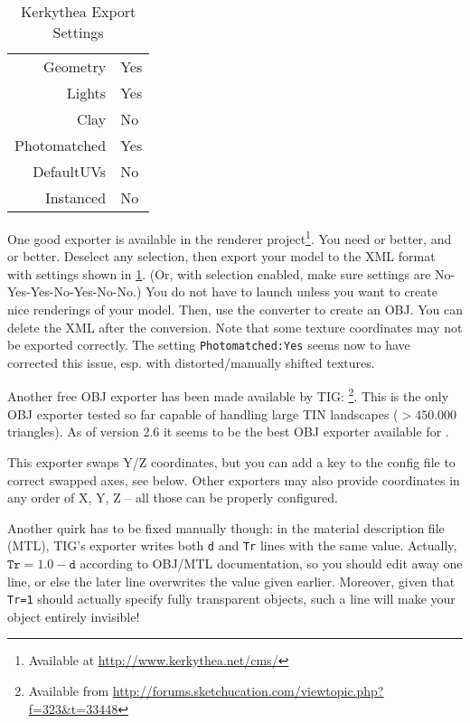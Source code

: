 \begin{table}[t]
  \centering
\begin{tabular}{rl}\toprule
Geometry&Yes\\Lights&Yes\\Clay&No\\Photomatched&Yes\\DefaultUVs&No\\Instanced&No\\\bottomrule
\end{tabular}
\caption{Kerkythea Export Settings}
  \label{fig:scenery3d:KerkytheaExportSettings}
\end{table}

One good exporter is available in the  renderer project\footnote{
Available at \url{http://www.kerkythea.net/cms/}}.  You need
or better, and  or better.  Deselect any selection, then
export your model to the  XML format with settings shown in
\ref{fig:scenery3d:KerkytheaExportSettings}.
(Or, with selection enabled, make sure settings are No-Yes-Yes-No-Yes-No-No.)  
You do not have to launch  unless you want to create nice renderings of
your model. 
Then, use the  converter to create an OBJ.  You can delete the
XML after the conversion.  Note that some texture coordinates may not be
exported correctly. The setting \texttt{Photomatched:Yes} seems now to have
corrected this issue, esp. with distorted/manu\-ally shifted textures.

Another free OBJ exporter has been made available by 
TIG: \footnote{Available from
\url{http://forums.sketchucation.com/viewtopic.php?f=323&t=33448}}. 
This is the only OBJ exporter tested so far capable of handling large TIN landscapes
($>450.000$ triangles). 
As of version 2.6 it seems to be the best OBJ exporter available for . 


This exporter swaps Y/Z coordinates, but you can add a key to the config file to
correct swapped axes, see below. Other exporters may also provide coordinates in
any order of X, Y, Z -- all those can be properly configured.

Another quirk has to be fixed manually though: in the material description file (MTL), TIG's exporter writes both \texttt{d} and \texttt{Tr} lines with the same value.
Actually, $\mathtt{Tr}=1.0-\mathtt{d}$ according to OBJ/MTL documentation, so you should edit away one line, or else the later line overwrites the value given earlier. 
Moreover, given that \texttt{Tr=1} should actually specify fully transparent objects, such a line will make your object entirely invisible!

